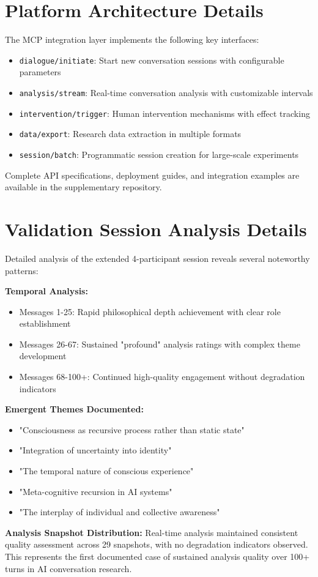 \documentclass[11pt,letterpaper]{article}
\newcommand{\mcp}{MCP}
\begin{document}



\appendix

\section{Platform Architecture Details}
\label{app:architecture}

The \mcp{} integration layer implements the following key interfaces:

\begin{itemize}
    \item \texttt{dialogue/initiate}: Start new conversation sessions with configurable parameters
    \item \texttt{analysis/stream}: Real-time conversation analysis with customizable intervals
    \item \texttt{intervention/trigger}: Human intervention mechanisms with effect tracking
    \item \texttt{data/export}: Research data extraction in multiple formats
    \item \texttt{session/batch}: Programmatic session creation for large-scale experiments
\end{itemize}

Complete API specifications, deployment guides, and integration examples are available in the supplementary repository.

\section{Validation Session Analysis Details}
\label{app:validation}

Detailed analysis of the extended 4-participant session reveals several noteworthy patterns:

\textbf{Temporal Analysis:}
\begin{itemize}
    \item Messages 1-25: Rapid philosophical depth achievement with clear role establishment
    \item Messages 26-67: Sustained "profound" analysis ratings with complex theme development
    \item Messages 68-100+: Continued high-quality engagement without degradation indicators
\end{itemize}

\textbf{Emergent Themes Documented:}
\begin{itemize}
    \item "Consciousness as recursive process rather than static state"
    \item "Integration of uncertainty into identity"
    \item "The temporal nature of conscious experience"
    \item "Meta-cognitive recursion in AI systems"
    \item "The interplay of individual and collective awareness"
\end{itemize}

\textbf{Analysis Snapshot Distribution:}
Real-time analysis maintained consistent quality assessment across 29 snapshots, with no degradation indicators observed. This represents the first documented case of sustained analysis quality over 100+ turns in AI conversation research.
\end{document}

